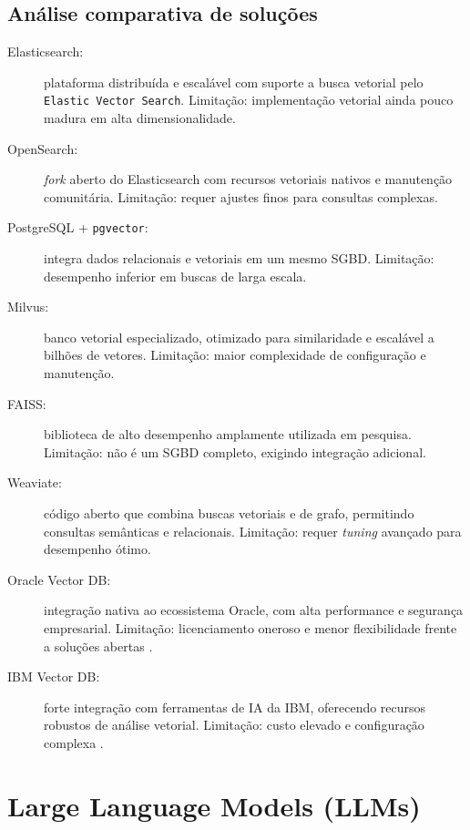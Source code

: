 \subsection{Análise comparativa de soluções}
\begin{description}
  \item[Elasticsearch:] plataforma distribuída e escalável com suporte a busca vetorial pelo \texttt{Elastic Vector Search}. Limitação: implementação vetorial ainda pouco madura em alta dimensionalidade.

  \item[OpenSearch:] \emph{fork} aberto do Elasticsearch com recursos vetoriais nativos e manutenção comunitária. Limitação: requer ajustes finos para consultas complexas.

  \item[PostgreSQL + \texttt{pgvector}:] integra dados relacionais e vetoriais em um mesmo SGBD. Limitação: desempenho inferior em buscas de larga escala.

  \item[Milvus:] banco vetorial especializado, otimizado para similaridade e escalável a bilhões de vetores. Limitação: maior complexidade de configuração e manutenção.

  \item[FAISS:] biblioteca de alto desempenho amplamente utilizada em pesquisa. Limitação: não é um SGBD completo, exigindo integração adicional.

  \item[Weaviate:] código aberto que combina buscas vetoriais e de grafo, permitindo consultas semânticas e relacionais. Limitação: requer \emph{tuning} avançado para desempenho ótimo.

  \item[Oracle Vector DB:] integração nativa ao ecossistema Oracle, com alta performance e segurança empresarial. Limitação: licenciamento oneroso e menor flexibilidade frente a soluções abertas \cite{oracle2025vector}.

  \item[IBM Vector DB:] forte integração com ferramentas de IA da IBM, oferecendo recursos robustos de análise vetorial. Limitação: custo elevado e configuração complexa \cite{ibm2025vector}.
\end{description}

\section{Large Language Models (LLMs)}
\label{sec:llm}

